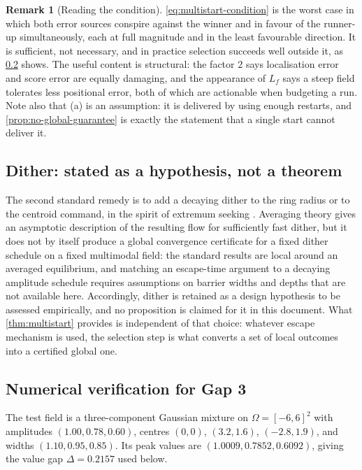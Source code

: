 \documentclass[11pt,a4paper]{article}
\theoremstyle{plain}
\theoremstyle{definition}
\newtheorem{remark}{Remark}
\newcommand{\NotationContext}[1]{\markboth{#1}{#1}}
\begin{document}
\begin{remark}[Reading the condition]\label{rem:multistart-reading}
\eqref{eq:multistart-condition} is the worst case in which both error sources conspire against
the winner and in favour of the runner-up simultaneously, each at full magnitude and in the least
favourable direction. It is sufficient, not necessary, and in practice selection succeeds well
outside it, as \cref{sec:gap3-numerics} shows. The useful content is structural: the factor $2$
says localisation error and score error are equally damaging, and the appearance of $L_f$ says a
steep field tolerates less positional error, both of which are actionable when budgeting a
run. Note also that (a) is an assumption: it is delivered by using enough restarts, and
\cref{prop:no-global-guarantee} is exactly the statement that a single start cannot deliver it.
\end{remark}

\subsection{Dither: stated as a hypothesis, not a theorem}\label{sec:gap3-dither}
\NotationContext{field}

The second standard remedy is to add a decaying dither to the ring radius or to the centroid
command, in the spirit of extremum seeking \cite{krsticwang2000,khong2014}. Averaging theory
gives an asymptotic description of the resulting flow for sufficiently fast dither, but it does
not by itself produce a global convergence certificate for a fixed dither schedule on a fixed
multimodal field: the standard results are local around an averaged equilibrium, and matching an
escape-time argument to a decaying amplitude schedule requires assumptions on barrier widths and
depths that are not available here. Accordingly, dither is retained as a design hypothesis to be
assessed empirically, and no proposition is claimed for it in this document. What
\cref{thm:multistart} provides is independent of that choice: whatever escape mechanism is used,
the selection step is what converts a set of local outcomes into a certified global one.

\subsection{Numerical verification for Gap 3}\label{sec:gap3-numerics}

The test field is a three-component Gaussian mixture on $\Omega=[-6,6]^2$ with amplitudes
$(1.00,0.78,0.60)$, centres $(0,0)$, $(3.2,1.6)$, $(-2.8,1.9)$, and widths $(1.10,0.95,0.85)$.
Its peak values are $(1.0009,0.7852,0.6092)$, giving the value gap
$\Delta=0.2157$ used below.
\end{document}
